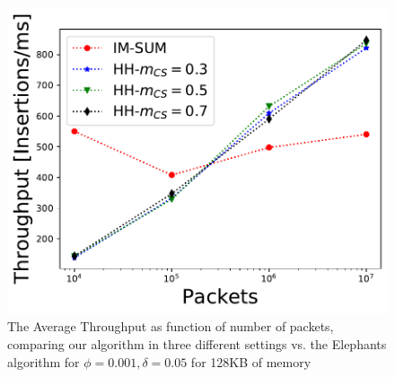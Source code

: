 \begin{figure}
    \includegraphics[width=\linewidth]{HH/figures/throughput_per_pkts_m=0.125.pdf}
    \caption[Average Throughput for 128KB of memory]{The Average Throughput as function of number of packets, comparing our algorithm in three different settings vs. the Elephants algorithm for $\phi=0.001,\delta=0.05$ for 128KB of memory}
    \label{fig:fig4_c}
\end{figure}

